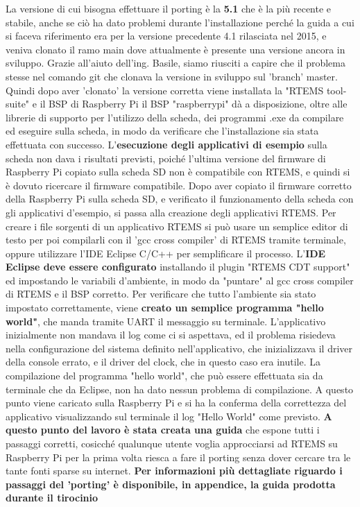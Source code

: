 \documentclass[12pt, a4paper, titlepage, oneside]{book}
\begin{document}
La versione di cui bisogna effettuare il porting è la \textbf{5.1} che è la più recente e stabile, anche se ciò ha dato problemi durante l'installazione perché la guida a cui si faceva riferimento era per la versione precedente 4.1 rilasciata nel 2015, e veniva clonato il ramo main dove attualmente è presente una versione ancora in sviluppo.\newline
Grazie all'aiuto dell'ing. Basile, siamo riusciti a capire che il problema stesse nel comando git che clonava la versione in sviluppo sul 'branch' master. Quindi dopo aver 'clonato' la versione corretta viene installata la "RTEMS tool-suite" e il BSP di Raspberry Pi \newline
il BSP "raspberrypi" dà a disposizione, oltre alle librerie di supporto per l'utilizzo della scheda, dei programmi .exe da compilare ed eseguire sulla scheda, in modo da verificare che l'installazione sia stata effettuata con successo.\newline
L'\textbf{esecuzione degli applicativi di esempio} sulla scheda non dava i risultati previsti, poiché l'ultima versione del firmware di Raspberry Pi copiato sulla scheda SD non è compatibile con RTEMS, e quindi si è dovuto ricercare il firmware compatibile. Dopo aver copiato il firmware corretto della Raspberry Pi sulla scheda SD, e verificato il funzionamento della scheda con gli applicativi d'esempio, si passa alla creazione degli applicativi RTEMS.\newline
Per creare i file sorgenti di un applicativo RTEMS si può usare un semplice editor di testo per poi compilarli con il 'gcc cross compiler' di RTEMS tramite terminale, oppure utilizzare l'IDE Eclipse C/C++ per semplificare il processo.\newline
L'\textbf{IDE Eclipse deve essere configurato} installando il plugin "RTEMS CDT support" ed impostando le variabili d'ambiente, in modo da "puntare" al gcc cross compiler di RTEMS e il BSP corretto.\newline
Per verificare che tutto l'ambiente sia stato impostato correttamente, viene \textbf{creato un semplice programma "hello world"}, che manda tramite UART il messaggio su terminale. L'applicativo inizialmente non mandava il log come ci si aspettava, ed il problema risiedeva nella configurazione del sistema definito nell'applicativo, che inizializzava il driver della console errato, e il driver del clock, che in questo caso era inutile.\newline
La compilazione del programma "hello world", che può essere effettuata sia da terminale che da Eclipse, non ha dato nessun problema di compilazione. A questo punto viene caricato sulla Raspberry Pi e si ha la conferma della correttezza del applicativo visualizzando sul terminale il log "Hello World" come previsto.\newline
\textbf{A questo punto del lavoro è stata creata una guida }che espone tutti i passaggi corretti, cosicché qualunque utente voglia approcciarsi ad RTEMS su Raspberry Pi per la prima volta riesca a fare il porting senza dover cercare tra le tante fonti sparse su internet.\newline
\textbf{Per informazioni più dettagliate riguardo i passaggi del 'porting' è disponibile, in appendice, la guida prodotta durante il tirocinio}
\end{document}
